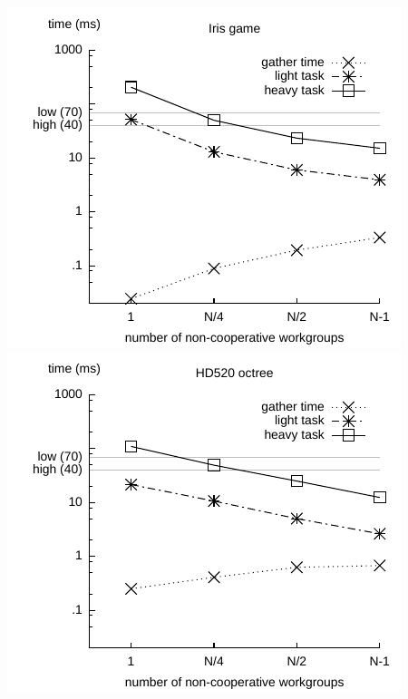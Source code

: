 \documentclass[parskip=half,sigconf,review, anonymous=true, acmcopyrightmode=none]{acmart}
\begin{document}
\includegraphics[width=.7\columnwidth]{images/ws/iris_connect_four_NA.pdf} \\
\includegraphics[width=.7\columnwidth]{images/ws/hd520_octree_NA.pdf} \\

\fi
\end{document}
